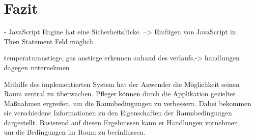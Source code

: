 \chapter{Fazit}

- JavaScript Engine hat eine Sicherheitslücke. --> Einfügen von JavaScript in Then Statement Feld möglich


temperaturanstiege, gas anstiege erkennen anhand des verlaufs,-> handlungen dagegen unternehmen


Mithilfe des implementierten System hat der Anwender die Möglichkeit seinen Raum zentral zu überwachen. Pfleger können durch die Applikation gezielter Maßnahmen ergreifen, um die Raumbedingungen zu verbessern. Dabei bekommen sie verschiedene Informationen zu den Eigenschaften der Raumbedingungen dargestellt. Basierend auf diesen Ergebnissen kann er Handlungen vornehmen, um die Bedingungen im Raum zu beeinflussen.


